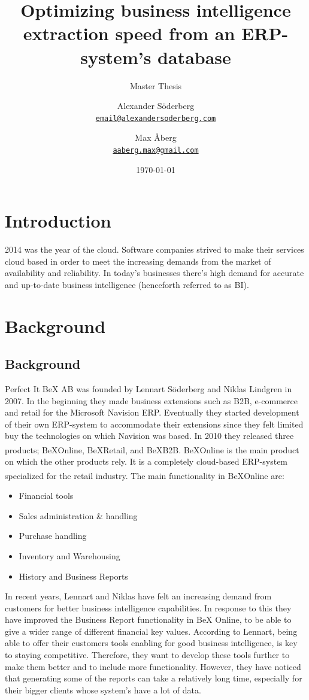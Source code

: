 \documentclass{cslthse-msc}
\author{
	Alexander Söderberg \\
	{\normalsize \href{mailto:email@alexandersoderberg.com}{\texttt{email@alexandersoderberg.com}}}
	\and
	Max Åberg \\
    {\normalsize \href{mailto:aaberg.max@gmail.com}{\texttt{aaberg.max@gmail.com}}}
}
\title{Optimizing business intelligence
extraction speed from an
ERP-system’s database}
\subtitle{Master Thesis}
\date{\today}
\newcommand{\bex}{BeX\textsuperscript{\textregistered}}
\begin{document}
\makefrontmatter
\chapter[Introduction]{Introduction}
2014 was the year of the cloud. Software companies strived to make their services cloud based in order to meet the increasing demands from the market of availability and reliability. 
In today's businesses there's high demand for accurate and up-to-date business intelligence (henceforth referred to as BI).

\chapter{Background}\label{sec:background}

\section{Background}
Perfect It BeX AB was founded by Lennart Söderberg and Niklas Lindgren in 2007. In the beginning they made business extensions such as B2B, e-commerce and retail for the Microsoft Navision ERP. Eventually they started development of their own ERP-system to accommodate their extensions since they felt limited buy the technologies on which Navision was based. In 2010 they released three products; \bex Online, \bex Retail, and \bex B2B. \bex Online is the main product on which the other products rely. It is a completely cloud-based ERP-system specialized for the retail industry. The main functionality in \bex Online are:

\begin{itemize}
\item Financial tools
\item Sales administration \& handling
\item Purchase handling
\item Inventory and Warehousing
\item History and Business Reports
\end{itemize}

In recent years, Lennart and Niklas have felt an increasing demand from customers for better business intelligence capabilities. In response to this they have improved the Business Report functionality in BeX Online, to be able to give a wider range of different financial key values. According to Lennart, being able to offer their customers tools enabling for good business intelligence, is key to staying competitive. Therefore, they want to develop these tools further to make them better and to include more functionality. However, they have noticed that generating some of the reports can take a relatively long time, especially for their bigger clients whose system's have a lot of data. \\
\end{document}
